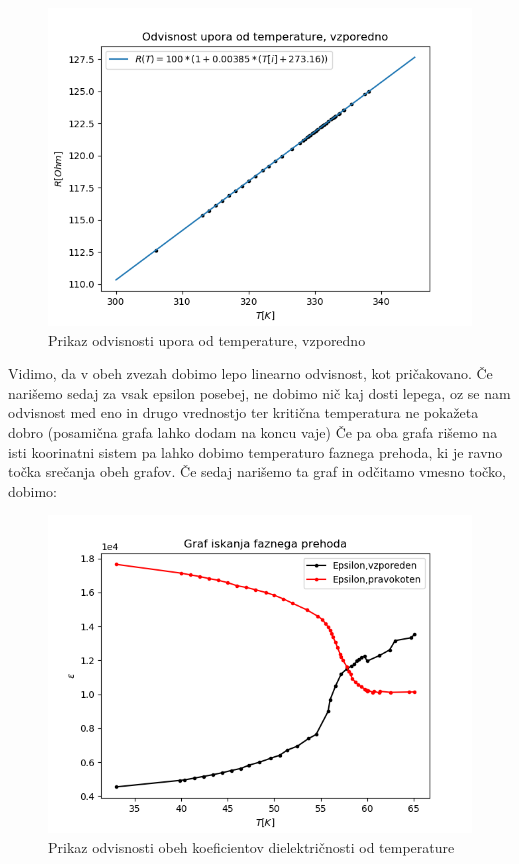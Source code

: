 \documentclass[11pt, a4paper]{article}
\theoremstyle{definition}
\theoremstyle{example}
\theoremstyle{izrek}
\begin{document}
\begin{figure}[H]
	\centering
    \includegraphics[width=12cm]{Upor_temperatura, vzporedno.png}
    \caption{Prikaz odvisnosti upora od temperature, vzporedno}
\end{figure}
Vidimo, da v obeh zvezah dobimo lepo linearno odvisnost, kot pričakovano. 
Če narišemo sedaj za vsak epsilon posebej, ne dobimo nič kaj dosti lepega, oz se nam odvisnost med eno in drugo vrednostjo ter kritična temperatura ne pokažeta dobro (posamična grafa lahko dodam na koncu vaje)
Če pa oba grafa rišemo na isti koorinatni sistem pa lahko dobimo temperaturo faznega prehoda, ki je ravno točka srečanja obeh grafov. Če sedaj narišemo ta graf in odčitamo vmesno točko, dobimo: 
\begin{figure}[H]
	\centering
    \includegraphics[width=12cm]{Fazni prehod.png}
    \caption{Prikaz odvisnosti obeh koeficientov dielektričnosti od temperature}
\end{figure}
\end{document}
